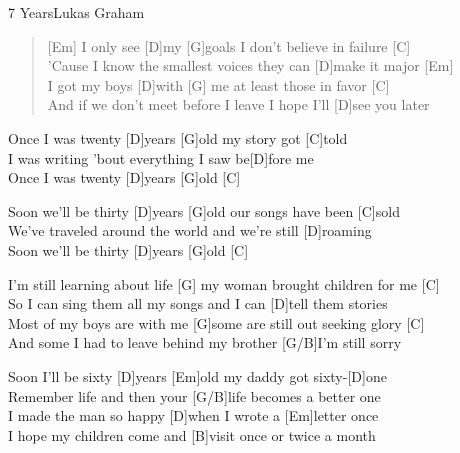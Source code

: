 \begin{song}{7 Years}{Lukas Graham}
    \begin{verse}
        [Em] I only see [D]my [G]goals I don't believe in failure [C]\\
        'Cause I know the smallest voices they can [D]make it major [Em]\\
        I got my boys [D]with [G] me at least those in favor [C]\\
        And if we don't meet before I leave I hope I'll [D]see you later
    \end{verse}
    
    \begin{chorus}
        [Em]Once I was twenty [D]years [G]old my story got [C]told\\
        I was writing 'bout everything I saw be[D]fore me\\
        [Em]Once I was twenty [D]years [G]old [C]\\
    \end{chorus}
    
    \begin{chorus}
        [Em]Soon we'll be thirty [D]years [G]old our songs have been [C]sold\\
        We've traveled around the world and we're still [D]roaming\\
        [Em]Soon we'll be thirty [D]years [G]old [C]
    \end{chorus}
    
    \begin{bridge}
        [Em]I'm still learning about life [G] my woman brought children for me [C]\\
        So I can sing them all my songs and I can [D]tell them stories\\
        [Em] Most of my boys are with me [G]some are still out seeking glory [C]\\
        And some I had to leave behind my brother [G/B]I'm still sorry
    \end{bridge}
    
    \begin{chorus}
        [C]Soon I'll be sixty [D]years [Em]old my daddy got sixty-[D]one\\
        Remember life and then your [G/B]life becomes a better one\\
        [C] I made the man so happy [D]when I wrote a [Em]letter once\\
        [Bsus4]I hope my children come and [B]visit once or twice a month
    \end{chorus}
    

\end{song}
